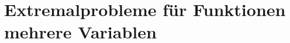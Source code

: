%
%
%
\chapter{Extremalprobleme für Funktionen mehrere Variablen
\label{buch:chapter:fuvar}}







